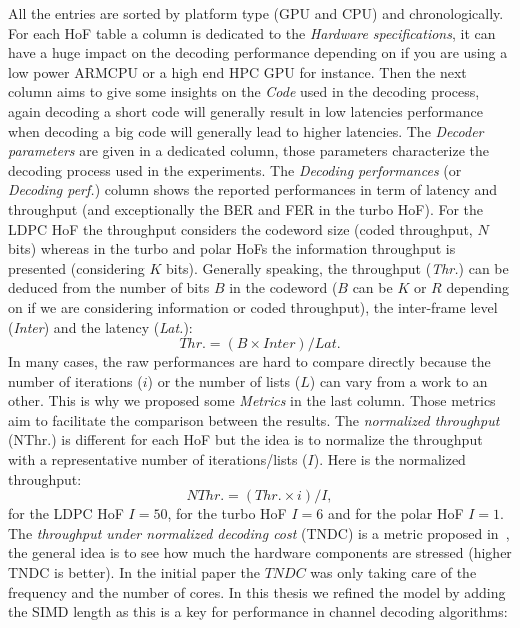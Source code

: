All the entries are sorted by platform type (GPU and CPU) and chronologically.
For each HoF table a column is dedicated to the \emph{Hardware specifications},
it can have a huge impact on the decoding performance depending on if you are
using a low power ARM\R CPU or a high end HPC GPU for instance. Then the next
column aims to give some insights on the \emph{Code} used in the decoding
process, again decoding a short code will generally result in low latencies
performance when decoding a big code will generally lead to higher latencies.
The \emph{Decoder parameters} are given in a dedicated column, those parameters
characterize the decoding process used in the experiments. The \emph{Decoding
performances} (or \emph{Decoding perf.}) column shows the reported performances
in term of latency and throughput (and exceptionally the BER and FER in the
turbo HoF). For the LDPC HoF the throughput considers the codeword size (coded
throughput, $N$ bits) whereas in the turbo and polar HoFs the information
throughput is presented (considering $K$ bits). Generally speaking, the
throughput (\emph{Thr.}) can be deduced from the number of bits $B$ in the
codeword ($B$ can be $K$ or $R$ depending on if we are considering information
or coded throughput), the inter-frame level (\emph{Inter}) and the latency
(\emph{Lat.}):
\begin{equation}
  Thr. = (B \times Inter) / Lat.
\end{equation}
In many cases, the raw performances are hard to compare directly because the
number of iterations ($i$) or the number of lists ($L$) can vary from a work to
an other. This is why we proposed some \emph{Metrics} in the last column. Those
metrics aim to facilitate the comparison between the results. The
\emph{normalized throughput} (NThr.) is different for each HoF but the idea is
to normalize the throughput with a representative number of iterations/lists
($I$). Here is the normalized throughput:
\begin{equation}
  NThr. = (Thr. \times i) / I,
\end{equation}
for the LDPC HoF $I = 50$, for the turbo HoF $I = 6$ and for the polar HoF
$I = 1$.
The \emph{throughput under normalized decoding cost} (TNDC) is a metric proposed
in~\cite{Ying2012}, the general idea is to see how much the hardware components
are stressed (higher TNDC is better). In the initial paper the $TNDC$ was only
taking care of the frequency and the number of cores. In this thesis we refined
the model by adding the SIMD length as this is a key for performance in channel
decoding algorithms:
